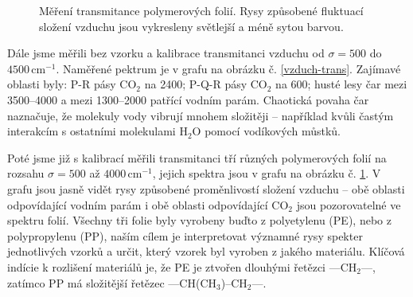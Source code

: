 \documentclass[10pt,a4paper]{article}
\renewcommand{\U}[1]{\ensuremath{\,\mathrm{#1}}}
\newcommand{\°}{\degree}
\begin{document}
\begin{figure}[p]
    \caption{Měření transmitance polymerových folií. Rysy způsobené fluktuací složení vzduchu jsou vykresleny světlejší a méně sytou barvou.}
    \label{pol-trans}
\end{figure}

Dále jsme měřili bez vzorku a kalibrace transmitanci vzduchu od $\sigma = 500$ do $4500 \U{cm^{-1}}$. Naměřené pektrum je v grafu na obrázku č. \ref{vzduch-trans}. Zajímavé oblasti byly: P-R pásy CO$_2$ na 2400; P-Q-R pásy CO$_2$ na 600; husté lesy čar mezi 3500--4000 a mezi 1300--2000 patřící vodním parám. Chaotická povaha čar naznačuje, že molekuly vody vibrují mnohem složitěji – například kvůli častým interakcím s ostatními molekulami H$_2$O pomocí vodíkových můstků.

Poté jsme již s kalibrací měřili transmitanci tří různých polymerových folií na rozsahu $\sigma = 500$ až $4000 \U{cm^{-1}}$, jejich spektra jsou v grafu na obrázku č. \ref{pol-trans}. V grafu jsou jasně vidět rysy způsobené proměnlivostí složení vzduchu – obě oblasti odpovídající vodním parám i obě oblasti odpovídající CO$_2$ jsou pozorovatelné ve spektru folií. Všechny tři folie byly vyrobeny buďto z polyetylenu (PE), nebo z polypropylenu (PP), naším cílem je interpretovat významné rysy spekter jednotlivých vzorků a určit, který vzorek byl vyroben z jakého materiálu. Klíčová indície k rozlišení materiálů je, že PE je ztvořen dlouhými řetězci —CH$_2$—, zatímco PP má složitější řetězec —CH(CH$_3$)–CH$_2$—.
\end{document}

